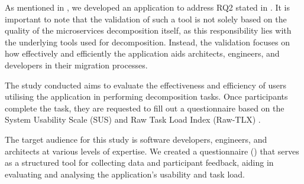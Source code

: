 As mentioned in , we developed an application to address
RQ2 stated in . It is important to note that the
validation of such a tool is not solely based on the quality of the
microservices decomposition itself, as this responsibility lies with the
underlying tools used for decomposition. Instead, the validation focuses on how
effectively and efficiently the application aids architects, engineers, and
developers in their migration processes.

The study conducted aims to evaluate the effectiveness and efficiency of users
utilising the application in performing decomposition tasks. Once participants
complete the task, they are requested to fill out a questionnaire based on the
System Usability Scale (SUS) \cite{brooke1996sus} and Raw Task Load Index
(Raw-TLX) \cite{hart2006nasa}.

The target audience for this study is software developers, engineers, and
architects at various levels of expertise. We created a questionnaire
() that serves as a structured tool for collecting data and
participant feedback, aiding in evaluating and analysing the application's
usability and task load.
